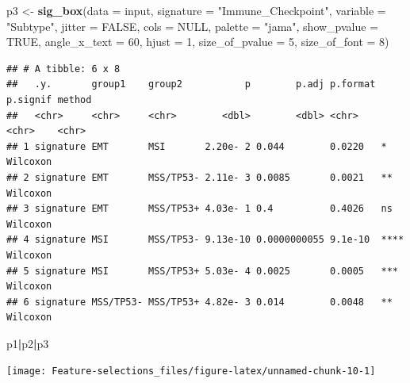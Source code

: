 \documentclass[
  12pt,
]{book}
\newenvironment{Shaded}{\begin{snugshade}}{\end{snugshade}}
\newcommand{\AttributeTok}[1]{\textcolor[rgb]{0.13,0.29,0.53}{#1}}
\newcommand{\ConstantTok}[1]{\textcolor[rgb]{0.56,0.35,0.01}{#1}}
\newcommand{\DecValTok}[1]{\textcolor[rgb]{0.00,0.00,0.81}{#1}}
\newcommand{\FunctionTok}[1]{\textcolor[rgb]{0.13,0.29,0.53}{\textbf{#1}}}
\newcommand{\NormalTok}[1]{#1}
\newcommand{\OtherTok}[1]{\textcolor[rgb]{0.56,0.35,0.01}{#1}}
\newcommand{\SpecialCharTok}[1]{\textcolor[rgb]{0.81,0.36,0.00}{\textbf{#1}}}
\newcommand{\StringTok}[1]{\textcolor[rgb]{0.31,0.60,0.02}{#1}}
\begin{document}
\begin{Shaded}
\begin{Highlighting}[]
\NormalTok{p3 }\OtherTok{\textless{}{-}} \FunctionTok{sig\_box}\NormalTok{(}\AttributeTok{data           =}\NormalTok{ input, }
              \AttributeTok{signature      =} \StringTok{"Immune\_Checkpoint"}\NormalTok{,}
              \AttributeTok{variable       =} \StringTok{"Subtype"}\NormalTok{,}
              \AttributeTok{jitter         =} \ConstantTok{FALSE}\NormalTok{,}
              \AttributeTok{cols           =} \ConstantTok{NULL}\NormalTok{,}
              \AttributeTok{palette        =} \StringTok{"jama"}\NormalTok{,}
              \AttributeTok{show\_pvalue    =} \ConstantTok{TRUE}\NormalTok{,}
              \AttributeTok{angle\_x\_text   =} \DecValTok{60}\NormalTok{, }
              \AttributeTok{hjust          =} \DecValTok{1}\NormalTok{, }
              \AttributeTok{size\_of\_pvalue =} \DecValTok{5}\NormalTok{, }
              \AttributeTok{size\_of\_font   =} \DecValTok{8}\NormalTok{)}
\end{Highlighting}
\end{Shaded}

\begin{verbatim}
## # A tibble: 6 x 8
##   .y.       group1    group2           p        p.adj p.format p.signif method  
##   <chr>     <chr>     <chr>        <dbl>        <dbl> <chr>    <chr>    <chr>   
## 1 signature EMT       MSI       2.20e- 2 0.044        0.0220   *        Wilcoxon
## 2 signature EMT       MSS/TP53- 2.11e- 3 0.0085       0.0021   **       Wilcoxon
## 3 signature EMT       MSS/TP53+ 4.03e- 1 0.4          0.4026   ns       Wilcoxon
## 4 signature MSI       MSS/TP53- 9.13e-10 0.0000000055 9.1e-10  ****     Wilcoxon
## 5 signature MSI       MSS/TP53+ 5.03e- 4 0.0025       0.0005   ***      Wilcoxon
## 6 signature MSS/TP53- MSS/TP53+ 4.82e- 3 0.014        0.0048   **       Wilcoxon
\end{verbatim}

\begin{Shaded}
\begin{Highlighting}[]
\NormalTok{p1}\SpecialCharTok{|}\NormalTok{p2}\SpecialCharTok{|}\NormalTok{p3}
\end{Highlighting}
\end{Shaded}

\begin{center}\texttt{[image: Feature-selections\_files/figure-latex/unnamed-chunk-10-1]} \end{center}
\end{document}
